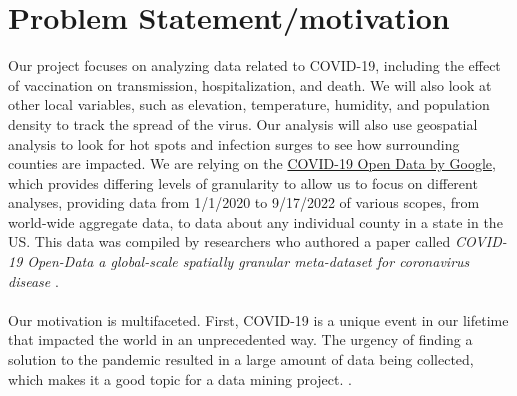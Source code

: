 \documentclass[manuscript,screen,review]{acmart}
\begin{document}


\maketitle

\begin{comment} %
    - classification: hot spots/zones for mortality, infection, death
    - geographical analysis: (need to pull in geospatial data) of the spread (potentially from areas identified as hot spots or areas that had recent high infection)
    - correlation: between temperature, humidity, etc
\end{comment}

\section{Problem Statement/motivation}
Our project focuses on analyzing data related to COVID-19, including the effect of vaccination on transmission, hospitalization, and death. We will also look at other local variables, such as elevation, temperature, humidity, and population density to track the spread of the virus. Our analysis will also use geospatial analysis to look for hot spots and infection surges to see how surrounding counties are impacted. We are relying on the \href{https://health.google.com/covid-19/open-data/}{COVID-19 Open Data by Google}, which provides differing levels of granularity to allow us to focus on different analyses, providing data from 1/1/2020 to 9/17/2022 of various scopes, from world-wide aggregate data, to data about any individual county in a state in the US. This data was compiled by researchers who authored a paper called \textit{COVID-19 Open-Data a global-scale spatially granular meta-dataset for coronavirus disease} \cite{wahltinez2022covid}.\\ \\
Our motivation is multifaceted. First, COVID-19 is a unique event in our lifetime that impacted the world in an unprecedented way. The urgency of finding a solution to the pandemic resulted in a large amount of data being collected, which makes it a good topic for a data mining project. 
\cite{wahltinez2022covid}. \\
\end{document}
